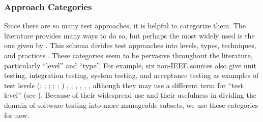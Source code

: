 
\subsubsection{Approach Categories}\label{cats-def}

Since there are so many test approaches, it is helpful to categorize them.
The literature provides many ways to do so, but perhaps the most widely used
is the one given by \ifnotpaper\else \citeauthor{IEEE2022} \fi \citet{IEEE2022}.
This schema divides test approaches into levels, types, techniques, and practices
\citeyearpar[Fig.~2; see ]{IEEE2022}. These categories seem
to be pervasive throughout the literature, particularly ``level'' and ``type''.
\label{nonIEEE-sources}%
For example, six non-IEEE sources also give unit testing, integration testing,
system testing, and acceptance testing as examples of test levels \ifnotpaper
    (\citealp[pp.~5\=/6 to 5\=/7]{SWEBOK2024}; \citealpISTQB{};
    \citealp[pp.~807\==808]{Perry2006}; \citealp[pp.~443\==445]{PetersAndPedrycz2000};
    \citealp[p.~218]{KuļešovsEtAl2013};
    \citealp[pp.~9, 13]{Gerrard2000a})\else
    \cite[pp.~443\==445]{PetersAndPedrycz2000},
    \cite[pp.~5\=/6 to 5\=/7]{SWEBOK2024}, \cite{ISTQB},
    \cite[pp.~807\==808]{Perry2006}, \cite[pp.~9, 13]{Gerrard2000a},
    \cite[p.~218]{KuļešovsEtAl2013}\fi,
although they may use a different term for ``test
level'' (see ). Because of their widespread use and
their usefulness in dividing the domain of software testing into more
manageable subsets, we use these categories for now.

\ifnotpaper
    \begin{landscape}
        \begin{table*}[hbtp!]
            \ieeeCatsTable{}
        \end{table*}
    \end{landscape}
\fi

